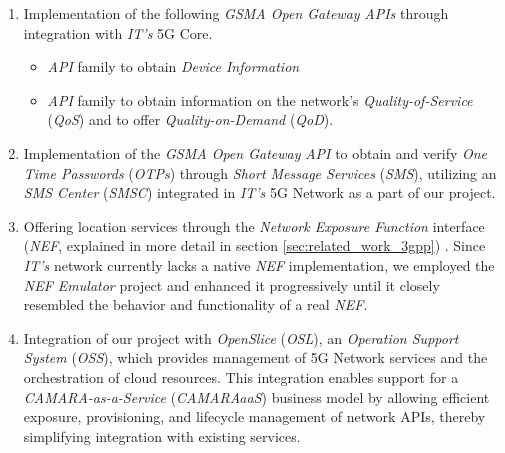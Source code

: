 \begin{enumerate}
	\item Implementation of the following \emph{GSMA
		      Open Gateway} \emph{APIs} through integration with
	      \emph{IT's} 5G Core.
	      \begin{itemize}
		      \item \emph{API} family to obtain \emph{Device Information}
		      \item \emph{API} family to obtain information on the network's
		            \emph{Quality-of-Service} (\emph{QoS}) and to offer
		            \emph{Quality-on-Demand} (\emph{QoD}).
	      \end{itemize}

	\item Implementation of the \emph{GSMA Open Gateway} \emph{API} to obtain and
	      verify \emph{One Time Passwords} (\emph{OTPs}) through \emph{Short Message
		      Services} (\emph{SMS}), utilizing an \emph{SMS Center} (\emph{SMSC})
	      integrated in \emph{IT's} 5G Network as a part of our project.

	\item Offering location services through the \emph{Network Exposure Function} interface
	      (\emph{NEF}, explained in more detail in section
	      \ref{sec:related_work_3gpp}) . Since
	      \emph{IT's} network currently lacks a native \emph{NEF} implementation, we
	      employed the \emph{NEF Emulator} project and enhanced it progressively
	      until it closely resembled the behavior and functionality of a real
	      \emph{NEF}.

	\item Integration of our project with \emph{OpenSlice}
	      (\emph{OSL})\cite{openslice}, an \emph{Operation Support System}
	      (\emph{OSS}), which provides management of 5G Network services and the
	      orchestration of cloud resources. This integration enables support for
	      a \emph{CAMARA-as-a-Service} (\emph{CAMARAaaS}) business model by
	      allowing efficient exposure, provisioning, and lifecycle management of
	      network APIs, thereby simplifying integration with existing services.
\end{enumerate}
